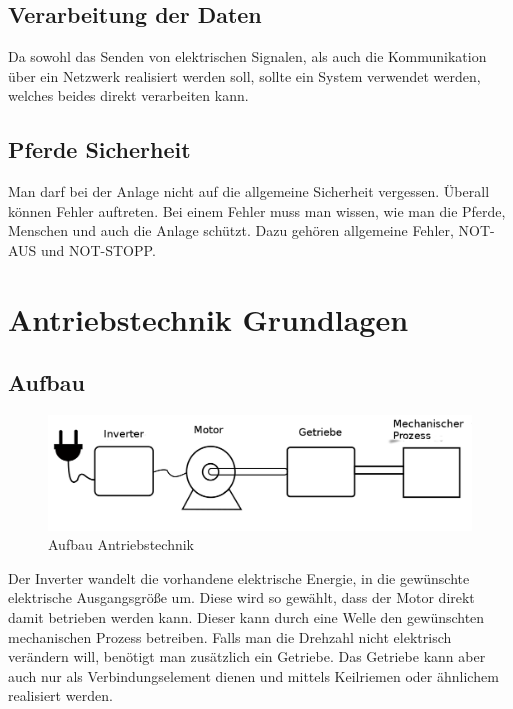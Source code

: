 \subsection{Verarbeitung der Daten}
\label{sec:verarbeitungDerDaten}

Da sowohl das Senden von elektrischen Signalen, als auch die Kommunikation über ein Netzwerk realisiert werden soll, sollte ein System verwendet werden, welches beides direkt verarbeiten kann. 

\subsection{Pferde Sicherheit}
\label{sec:pferdeSicherheit}

Man darf bei der Anlage nicht auf die allgemeine Sicherheit vergessen. Überall können Fehler auftreten. Bei einem Fehler muss man wissen, wie man die Pferde, Menschen und auch die Anlage schützt. Dazu gehören allgemeine Fehler, NOT-AUS und NOT-STOPP.
\newpage

\section{Antriebstechnik Grundlagen\cite{antriebstechnik}}
\label{sec:antriebstechnikGrundlagen}

\subsection{Aufbau}
\label{sec:aufbau}
\begin{figure}[H]
\begin{center}
	\includegraphics[width=1\textwidth]{fig/AntriebstechnikAufbau}
	\caption{Aufbau Antriebstechnik \label{fig:abbildungAufbau}}
\end{center}
\end{figure}

Der Inverter wandelt die vorhandene elektrische Energie, in die gewünschte elektrische Ausgangsgröße um. 
Diese wird so gewählt, dass der Motor direkt damit betrieben werden kann. Dieser kann durch eine Welle den gewünschten mechanischen Prozess betreiben.  Falls man die Drehzahl nicht elektrisch verändern will, benötigt man zusätzlich ein Getriebe. Das Getriebe kann aber auch nur als Verbindungselement dienen und mittels Keilriemen oder ähnlichem realisiert werden.


